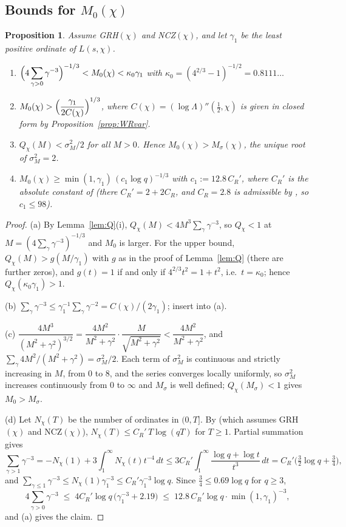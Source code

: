 \documentclass[11pt]{amsart}
\newtheorem{proposition}[theorem]{Proposition}
\theoremstyle{definition}
\numberwithin{equation}{section}
\begin{document}
\subsection{Bounds for \texorpdfstring{$M_0(\chi)$}{M0(chi)}}

\begin{proposition}\label{prop:M0}
Assume GRH$(\chi)$ and NCZ$(\chi)$, and let $\gamma_1$ be the least
positive ordinate of $L(s,\chi)$.
\begin{enumerate}
\item[(a)] $\displaystyle
\Bigl(4\sum_{\gamma>0}\gamma^{-3}\Bigr)^{-1/3}<M_0(\chi)<\kappa_0\gamma_1$
with $\kappa_0=(4^{2/3}-1)^{-1/2}=0.8111\ldots$
\item[(b)] $\displaystyle M_0(\chi)>
\Bigl(\frac{\gamma_1}{2C(\chi)}\Bigr)^{1/3}$, where
$C(\chi)=(\log\Lambda)''(\tfrac12,\chi)$ is given in closed form by
Proposition~\ref{prop:WRvar}.
\item[(c)] $Q_\chi(M)<\sigma_M^2/2$ for all $M>0$. Hence
$M_0(\chi)>M_\sigma(\chi)$, the unique root of $\sigma_M^2=2$.
\item[(d)] $M_0(\chi)\ge\min(1,\gamma_1)\,(c_1\log q)^{-1/3}$ with
$c_1:=12.8\,C_R'$, where $C_R'$ is the absolute constant of
\cite[Lemma~9(b)]{WR} (there $C_R'=2+2C_R$, and $C_R=2.8$ is
admissible by \cite[Corollary~1.2]{BMOR21}, so $c_1\le98$).
\end{enumerate}
\end{proposition}

\begin{proof}
(a) By Lemma~\ref{lem:Q}(i), $Q_\chi(M)<4M^3\sum_\gamma\gamma^{-3}$,
so $Q_\chi<1$ at $M=(4\sum_\gamma\gamma^{-3})^{-1/3}$ and $M_0$ is
larger. For the upper bound, $Q_\chi(M)>g(M/\gamma_1)$ with $g$ as in
the proof of Lemma~\ref{lem:Q} (there are further zeros), and
$g(t)=1$ if and only if $4^{2/3}t^2=1+t^2$, i.e.\ $t=\kappa_0$; hence
$Q_\chi(\kappa_0\gamma_1)>1$.

(b) $\sum_\gamma\gamma^{-3}\le\gamma_1^{-1}\sum_\gamma\gamma^{-2}
=C(\chi)/(2\gamma_1)$; insert into (a).

(c) $\dfrac{4M^3}{(M^2+\gamma^2)^{3/2}}
=\dfrac{4M^2}{M^2+\gamma^2}\cdot\dfrac{M}{\sqrt{M^2+\gamma^2}}
<\dfrac{4M^2}{M^2+\gamma^2}$, and
$\sum_\gamma4M^2/(M^2+\gamma^2)=\sigma_M^2/2$. Each term of
$\sigma_M^2$ is continuous and strictly increasing in $M$, from $0$
to $8$, and the series converges locally uniformly, so $\sigma_M^2$
increases continuously from $0$ to $\infty$ and $M_\sigma$ is well
defined; $Q_\chi(M_\sigma)<1$ gives $M_0>M_\sigma$.

(d) Let $N_\chi(T)$ be the number of ordinates in $(0,T]$. By
\cite[Lemma~9(b)]{WR} (which assumes GRH$(\chi)$ and NCZ$(\chi)$),
$N_\chi(T)\le C_R'\,T\log(qT)$ for $T\ge1$. Partial summation gives
\[
\sum_{\gamma>1}\gamma^{-3}=-N_\chi(1)+3\int_1^\infty N_\chi(t)t^{-4}\,dt
\le3C_R'\int_1^\infty\frac{\log q+\log t}{t^3}\,dt
=C_R'\bigl(\tfrac32\log q+\tfrac34\bigr),
\]
and $\sum_{\gamma\le1}\gamma^{-3}\le N_\chi(1)\gamma_1^{-3}\le
C_R'\gamma_1^{-3}\log q$. Since $\tfrac34\le0.69\log q$ for $q\ge3$,
\[
4\sum_{\gamma>0}\gamma^{-3}\;\le\;
4C_R'\log q\,\bigl(\gamma_1^{-3}+2.19\bigr)
\;\le\;12.8\,C_R'\log q\cdot\min(1,\gamma_1)^{-3},
\]
and (a) gives the claim.
\end{proof}
\end{document}
